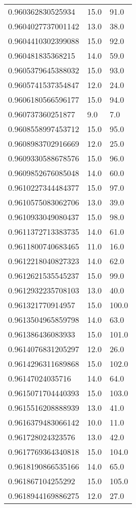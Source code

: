 \begin{center}
\begin{supertabular}[H]{p{0.30\textwidth}p{0.05\textwidth}p{0.05\textwidth}}
0.960362830525934 & 15.0 & 91.0 \\ 
0.9604027737001142 & 13.0 & 38.0 \\ 
0.9604410302399088 & 15.0 & 92.0 \\ 
0.960481835368215 & 14.0 & 59.0 \\ 
0.9605379645388032 & 15.0 & 93.0 \\ 
0.9605741537354847 & 12.0 & 24.0 \\ 
0.9606180566596177 & 15.0 & 94.0 \\ 
0.960737360251877 & 9.0 & 7.0 \\ 
0.9608558997453712 & 15.0 & 95.0 \\ 
0.9608983702916669 & 12.0 & 25.0 \\ 
0.9609330588678576 & 15.0 & 96.0 \\ 
0.9609852676085048 & 14.0 & 60.0 \\ 
0.9610227344484377 & 15.0 & 97.0 \\ 
0.9610575083062706 & 13.0 & 39.0 \\ 
0.9610933049080437 & 15.0 & 98.0 \\ 
0.9611372713383735 & 14.0 & 61.0 \\ 
0.9611800740683465 & 11.0 & 16.0 \\ 
0.9612218040827323 & 14.0 & 62.0 \\ 
0.9612621535545237 & 15.0 & 99.0 \\ 
0.9612932235708103 & 13.0 & 40.0 \\ 
0.961321770914957 & 15.0 & 100.0 \\ 
0.9613504965859798 & 14.0 & 63.0 \\ 
0.961386436083933 & 15.0 & 101.0 \\ 
0.9614076831205297 & 12.0 & 26.0 \\ 
0.9614296311689868 & 15.0 & 102.0 \\ 
0.96147024035716 & 14.0 & 64.0 \\ 
0.9615071704440393 & 15.0 & 103.0 \\ 
0.9615516208888939 & 13.0 & 41.0 \\ 
0.9616379483066142 & 10.0 & 11.0 \\ 
0.961728024323576 & 13.0 & 42.0 \\ 
0.9617769364340818 & 15.0 & 104.0 \\ 
0.9618190866535166 & 14.0 & 65.0 \\ 
0.961867104255292 & 15.0 & 105.0 \\ 
0.9618944169886275 & 12.0 & 27.0 \\ 

\end{supertabular}
\end{center}
